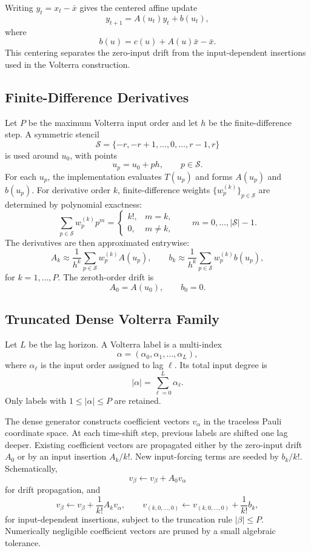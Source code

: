 \documentclass[11pt]{article}
\begin{document}
Writing $y_t = x_t - \bar{x}$ gives the centered affine update
\[
    y_{t+1}
    =
    A(u_t)y_t + b(u_t),
\]
where
\[
    b(u) = c(u) + A(u)\bar{x} - \bar{x}.
\]
This centering separates the zero-input drift from the input-dependent
insertions used in the Volterra construction.

\subsection{Finite-Difference Derivatives}

Let $P$ be the maximum Volterra input order and let $h$ be the finite-difference
step.  A symmetric stencil
\[
    \mathcal{S} = \{-r,-r+1,\ldots,0,\ldots,r-1,r\}
\]
is used around $u_0$, with points
\[
    u_p = u_0 + p h,
    \qquad p \in \mathcal{S}.
\]
For each $u_p$, the implementation evaluates $T(u_p)$ and forms $A(u_p)$ and
$b(u_p)$.  For derivative order $k$, finite-difference weights
$\{w_p^{(k)}\}_{p\in\mathcal{S}}$ are determined by polynomial exactness:
\[
    \sum_{p\in\mathcal{S}} w_p^{(k)} p^m
    =
    \begin{cases}
        k!, & m = k, \\
        0,  & m \ne k,
    \end{cases}
    \qquad
    m = 0,\ldots,|\mathcal{S}|-1.
\]
The derivatives are then approximated entrywise:
\[
    A_k
    \approx
    \frac{1}{h^k}\sum_{p\in\mathcal{S}} w_p^{(k)} A(u_p),
    \qquad
    b_k
    \approx
    \frac{1}{h^k}\sum_{p\in\mathcal{S}} w_p^{(k)} b(u_p),
\]
for $k=1,\ldots,P$.  The zeroth-order drift is
\[
    A_0 = A(u_0),
    \qquad
    b_0 = 0.
\]

\subsection{Truncated Dense Volterra Family}

Let $L$ be the lag horizon.  A Volterra label is a multi-index
\[
    \alpha = (\alpha_0,\alpha_1,\ldots,\alpha_L),
\]
where $\alpha_\ell$ is the input order assigned to lag $\ell$.  Its total input
degree is
\[
    |\alpha| = \sum_{\ell=0}^{L} \alpha_\ell.
\]
Only labels with $1 \le |\alpha| \le P$ are retained.

The dense generator constructs coefficient vectors $v_\alpha$ in the traceless
Pauli coordinate space.  At each time-shift step, previous labels are shifted
one lag deeper.  Existing coefficient vectors are propagated either by the
zero-input drift $A_0$ or by an input insertion $A_k/k!$.  New input-forcing
terms are seeded by $b_k/k!$.  Schematically,
\[
    v_\beta \leftarrow v_\beta + A_0 v_\alpha
\]
for drift propagation, and
\[
    v_\beta \leftarrow v_\beta + \frac{1}{k!}A_k v_\alpha,
    \qquad
    v_{(k,0,\ldots,0)} \leftarrow v_{(k,0,\ldots,0)} + \frac{1}{k!}b_k,
\]
for input-dependent insertions, subject to the truncation rule
$|\beta|\le P$.  Numerically negligible coefficient vectors are pruned by a
small algebraic tolerance.
\end{document}
